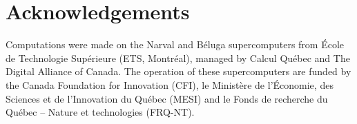 \section*{Acknowledgements}
Computations were made on the Narval and B\'eluga supercomputers from \'Ecole de Technologie Sup\'erieure (ETS, Montr\'eal), managed by Calcul Qu\'ebec and The Digital Alliance of Canada. The operation of these supercomputers are funded by the Canada Foundation for Innovation (CFI), le Ministère de l’Économie, des Sciences et de l’Innovation du Québec (MESI) and le Fonds de recherche du Québec – Nature et technologies (FRQ-NT). \cite{li2020pytorch}
